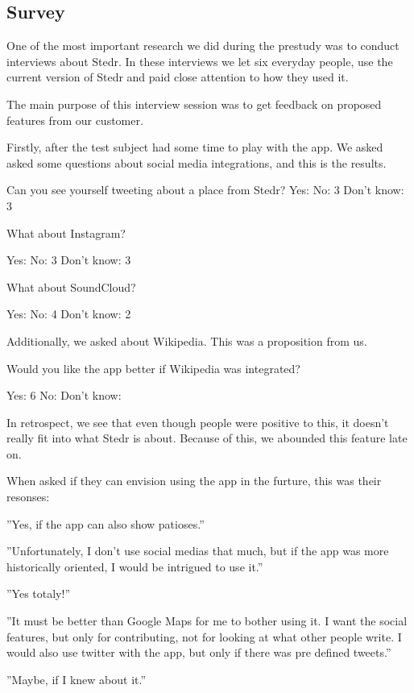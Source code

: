 		
	\subsection{Survey}


	One of the most important research we did during the prestudy was to conduct interviews about Stedr. In these interviews we let six everyday people, use the current version of Stedr and paid close attention to how they used it.

	The main purpose of this interview session was to get feedback on proposed features from our customer.

	Firstly, after the test subject had some time to play with the app. We asked asked some questions about social media integrations, and this is the results.

	Can you see yourself tweeting about a place from Stedr?
	Yes:
	No: 3
	Don't know: 3


	What about Instagram?

	Yes:
	No: 3
	Don't know: 3

	What about SoundCloud?

	Yes:
	No: 4
	Don't know: 2

	Additionally, we asked about Wikipedia. This was a proposition from us.

	Would you like the app better if Wikipedia was integrated?

	Yes: 6
	No: 
	Don't know:  

	In retrospect, we see that even though people were positive to this, it doesn't really fit into what Stedr is about. Because of this, we abounded this feature late on.

	When asked if they can envision using the app in the furture, this was their resonses:

	”Yes, if the app can also show patioses.”


	”Unfortunately, I don't use social medias that much, but if the app was more historically oriented, I would be intrigued to use it.”


	”Yes totaly!”

	”It must be better than Google Maps for me to bother using it. I want the social features, but only for contributing, not for looking at what other people write. I would also use twitter with the app, but only if there was pre defined tweets.”



	”Maybe, if I knew about it.”



